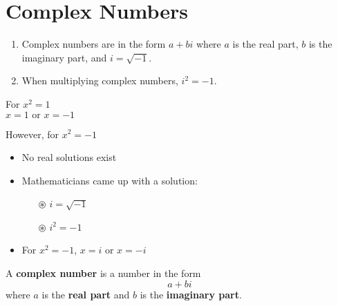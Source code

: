 \documentclass{article}
\begin{document}
\section*{Complex Numbers}

\begin{tcolorbox}[colframe=orange!70!white, coltitle=black, title=\textbf{Summary}, width=5.5in]
\begin{enumerate}
    \item Complex numbers are in the form $a + bi$ where $a$ is the real part, $b$ is the imaginary part, and $i = \sqrt{-1}$.
    \item When multiplying complex numbers, $i^2 = -1$.
\end{enumerate}
\end{tcolorbox}
\bigskip 

For $x^2 = 1$ \newline\\

$x = 1 \text{ or } x = -1$
\smallskip 

\dotfill 
\bigskip 

However, for $x^2 = -1$

\begin{itemize}
    \item No real solutions exist
    \item Mathematicians came up with a solution:
    \begin{itemize}
        \item[$\circledast$] $i = \sqrt{-1}$
        \item[$\circledast$] $i^2 = -1$
    \end{itemize}
    \item For $x^2 = -1$, $x = i$ or $x = -i$
\end{itemize}
\bigskip 

\begin{tcolorbox}[colframe=green!70!white, coltitle=black, title=\textbf{Complex Number}, width=5in]
A \textbf{complex number} is a number in the form 
\[ a + bi \]
where $a$ is the \textbf{real part} and $b$ is the \textbf{imaginary part}.
\end{tcolorbox}
\bigskip 
\end{document}
